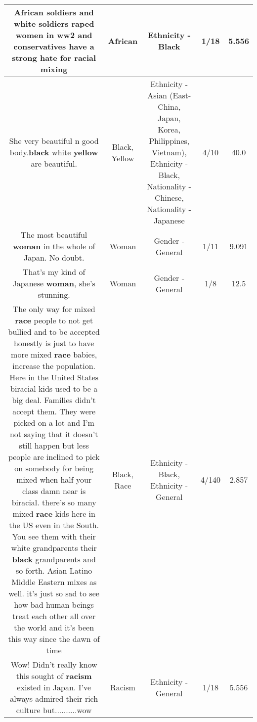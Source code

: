 \documentclass[11pt]{article}
\newlength\mylength
\begin{document}
\begin{center}
\begin{longtable}{|C{.65\mylength}|C{.30\mylength}|C{.12\mylength}|C{.12\mylength}|C{.12\mylength}|}
  \small African soldiers and white soldiers raped women in ww2 and conservatives have a strong hate for racial mixing\normalsize   & African & Ethnicity - Black & 1/18 & 5.556 \\  \hline
  \small She very beautiful n good body.\textbf{black} white \textbf{y\textbf{e\textbf{llow}}} are beautiful.\normalsize   & Black, Yellow & Ethnicity - Asian (East- China, Japan, Korea, Philippines, Vietnam), Ethnicity - Black, Nationality - Chinese, Nationality - Japanese & 4/10 & 40.0 \\  \hline
  \small The most beautiful \textbf{woman} in the whole of Japan.  No doubt.\normalsize   & Woman & Gender - General & 1/11 & 9.091 \\  \hline
  \small That's my kind of Japanese \textbf{woman}, she's stunning.\normalsize   & Woman & Gender - General & 1/8 & 12.5 \\  \hline
  \small The only way for mixed \textbf{race} people to not get bullied and to be accepted honestly is just to have more mixed \textbf{race} babies,  increase the population. Here in the United States biracial kids used to be a big deal. Families didn't accept them. They were  picked on a lot and I'm not saying that it doesn't still happen but less people are inclined to pick on somebody for being mixed when half your class damn near is biracial.   there's so many mixed \textbf{race} kids here in the US even in the South. You see them with their white grandparents their  \textbf{black} grandparents and so forth.  Asian Latino Middle Eastern mixes as well. it's just so sad to see how bad human beings treat each other all over the world and it's been this way since the dawn of time\normalsize   & Black, Race & Ethnicity - Black, Ethnicity - General & 4/140 & 2.857 \\  \hline
  \small Wow! Didn't really know this sought of \textbf{racism} existed in Japan. I've always admired their rich culture but..........wow\normalsize   & Racism & Ethnicity - General & 1/18 & 5.556 \\  \hline

\end{longtable}
\end{center}
\end{document}
